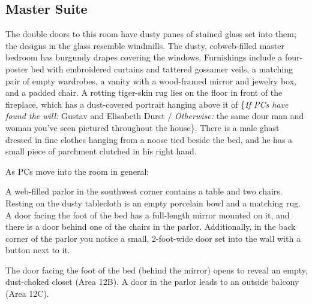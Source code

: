 \subsection{Master Suite}
\label{sec:MasterSuite}
\begin{readout}
  The double doors to this room have dusty panes of stained glass set into them; the designs in the glass
  resemble windmills. The dusty, cobweb-filled master bedroom has burgundy drapes covering the windows.
  Furnishings include a four-poster bed with embroidered curtains and tattered gossamer veils, a matching pair
  of empty wardrobes, a vanity with a wood-framed mirror and jewelry box, and a padded chair. A rotting
  tiger-skin rug lies on the floor in front of the fireplace, which has a dust-covered portrait hanging above it
  of \{\textit{If PCs have found the will:} Gustav and Elisabeth Durst / \textit{Otherwise:} the same dour
  man and woman you've seen pictured throughout the house\}. There is a male ghast dressed in fine clothes
  hanging from a noose tied beside the bed, and he has a small piece of parchment clutched in his right hand.
\end{readout}
As PCs move into the room in general:
\begin{readout}
  A web-filled parlor in the southwest corner contains a table and two chairs. Resting on the dusty tablecloth
  is an empty porcelain bowl and a matching rug. A door facing the foot of the bed has a full-length mirror
  mounted on it, and there is a door behind one of the chairs in the parlor. Additionally, in the back corner
  of the parlor you notice a small, 2-foot-wide door set into the wall with a button next to it.
\end{readout}
The door facing the foot of the bed (behind the mirror) opens to reveal an empty, dust-choked closet (Area 12B).
A door in the parlor leads to an outside balcony (Area 12C).

